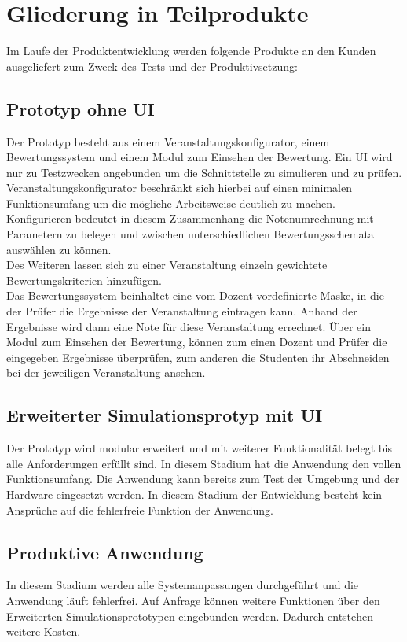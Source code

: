 	\section{Gliederung in Teilprodukte}
	
	Im Laufe der Produktentwicklung werden folgende Produkte an den Kunden ausgeliefert zum Zweck des Tests und der Produktivsetzung:
	
	\subsection{Prototyp ohne UI}
	Der Prototyp besteht aus einem  Veranstaltungskonfigurator, einem Bewertungssystem und einem Modul zum Einsehen der Bewertung. Ein UI wird nur zu Testzwecken angebunden um die Schnittstelle zu simulieren und zu prüfen. \\
	Veranstaltungskonfigurator beschränkt sich hierbei auf einen minimalen Funktionsumfang um die mögliche Arbeitsweise deutlich zu machen.\\ 
	Konfigurieren bedeutet in diesem Zusammenhang die Notenumrechnung mit Parametern zu belegen und zwischen unterschiedlichen Bewertungsschemata auswählen zu können.\\ 
	Des Weiteren lassen sich zu einer Veranstaltung einzeln gewichtete Bewertungskriterien hinzufügen.\\ 
	Das Bewertungssystem beinhaltet eine vom Dozent vordefinierte Maske, in die der Prüfer die Ergebnisse der Veranstaltung eintragen kann. Anhand der Ergebnisse wird dann eine Note für diese Veranstaltung errechnet.
	Über ein Modul zum Einsehen der Bewertung, können zum einen Dozent und Prüfer die eingegeben Ergebnisse überprüfen, zum anderen die Studenten ihr Abschneiden bei der jeweiligen Veranstaltung ansehen.
	
	\subsection{Erweiterter Simulationsprotyp mit UI}
	Der Prototyp wird modular erweitert und mit weiterer Funktionalität belegt bis alle Anforderungen erfüllt sind. In diesem Stadium hat die Anwendung den vollen Funktionsumfang. Die Anwendung kann bereits zum Test der Umgebung und der Hardware eingesetzt werden. 
	In diesem Stadium der Entwicklung besteht kein Ansprüche auf die fehlerfreie Funktion der Anwendung.
	
	\subsection{Produktive Anwendung}
	In diesem Stadium werden alle Systemanpassungen durchgeführt und die Anwendung läuft fehlerfrei. Auf Anfrage können weitere Funktionen über den Erweiterten Simulationsprototypen eingebunden werden. Dadurch entstehen weitere Kosten.
	
